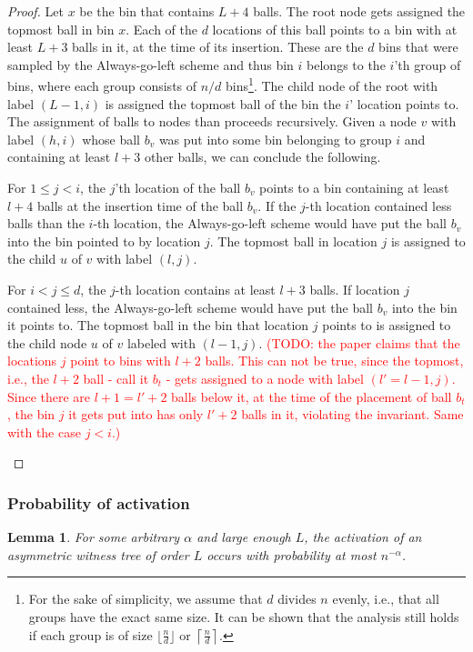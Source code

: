 \documentclass[a4paper,12pt]{article}
\newcommand\todo[1]{\textcolor{red}{(TODO: #1)}}
\newtheorem{lemma}{Lemma}
\begin{document}
\begin{proof}
Let $x$ be the bin that contains $L+4$ balls. The root node gets assigned the topmost ball in bin $x$. Each of the $d$ locations of this ball points to a bin with at least $L+3$ balls in it, at the time of its insertion. These are the $d$ bins that were sampled by the Always-go-left scheme and thus bin $i$ belongs to the $i$'th group of bins, where each group consists of $n/d$ bins\footnote{For the sake of simplicity, we assume that $d$ divides $n$ evenly, i.e., that all groups have the exact same size. It can be shown that the analysis still holds if each group is of size $\lfloor\frac{n}{d}\rfloor$ or $\left\lceil\frac{n}{d}\right\rceil$.}. The child node of the root with label $(L-1, i)$ is assigned the topmost ball of the bin the $i$' location points to. The assignment of balls to nodes than proceeds recursively. Given a node $v$ with label $(h, i)$ whose ball $b_v$ was put into some bin belonging to group $i$ and containing at least $l+3$ other balls, we can conclude the following.
\begin{compactitem}
\item For $1\leq j < i$, the $j$'th location of the ball $b_v$ points to a bin containing at least $l+4$ balls at the insertion time of the ball $b_v$. If the $j$-th location contained less balls than the $i$-th location, the Always-go-left scheme would have put the ball $b_v$ into the bin pointed to by location $j$. The topmost ball in location $j$ is assigned to the  child $u$ of $v$ with label $(l,j)$. 
\item For $i < j \leq d$, the $j$-th location contains at least $l+3$ balls. If location $j$ contained less, the Always-go-left scheme would have put the ball $b_v$ into the bin it points to. The topmost ball in the bin that location $j$ points to is assigned to the child node $u$ of $v$ labeled with $(l-1, j)$. \todo{the paper claims that the locations $j$ point to bins with $l+2$ balls. This can not be true, since the topmost, i.e., the $l+2$ ball - call it $b_t$ - gets assigned to a node with label $(l'=l-1, j)$. Since there are $l+1=l'+2$ balls below it, at the time of the placement of ball $b_t$, the bin $j$ it gets put into has only $l'+2$ balls in it, violating the invariant. Same with the case $j<i$.} 
\end{compactitem}
\end{proof}

\subsubsection{Probability of activation}
\label{sec:analysis:probabilityAsymWT}
\begin{lemma}\label{lemma:awt:activation}
For some arbitrary $\alpha$ and large enough $L$, the activation of an asymmetric witness tree of order $L$ occurs with probability at most $n^{-\alpha}$.
\end{lemma}
\end{document}
